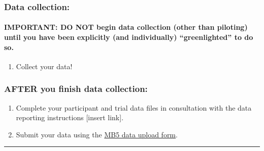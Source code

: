 \documentclass[
]{book}
\providecommand{\tightlist}{%
  \setlength{\itemsep}{0pt}\setlength{\parskip}{0pt}}
\begin{document}
\hypertarget{data-collection}{%
\subsubsection*{Data collection:}\label{data-collection}}

\hypertarget{important-do-not-begin-data-collection-other-than-piloting-until-you-have-been-explicitly-and-individually-greenlighted-to-do-so.}{%
\paragraph*{IMPORTANT: DO NOT begin data collection (other than piloting) until you have been explicitly (and individually) ``greenlighted'' to do so.}\label{important-do-not-begin-data-collection-other-than-piloting-until-you-have-been-explicitly-and-individually-greenlighted-to-do-so.}}

\begin{enumerate}
\def\labelenumi{\arabic{enumi}.}
\setcounter{enumi}{9}
\tightlist
\item
  Collect your data!
\end{enumerate}

\hypertarget{after-you-finish-data-collection}{%
\subsubsection*{AFTER you finish data collection:}\label{after-you-finish-data-collection}}

\begin{enumerate}
\def\labelenumi{\arabic{enumi}.}
\setcounter{enumi}{10}
\tightlist
\item
  Complete your participant and trial data files in consultation with the data reporting instructions {[}insert link{]}.
\item
  Submit your data using the \href{https://docs.google.com/forms/d/e/1FAIpQLSdFYk-gb4yjRYLjSTP1_BVaW-3vLkpJClLoY2BOGDGfIVE5ww/viewform?usp=sf_link}{MB5 data upload form}.
\end{enumerate}

\begin{center}\rule{0.5\linewidth}{0.5pt}\end{center}
\end{document}
